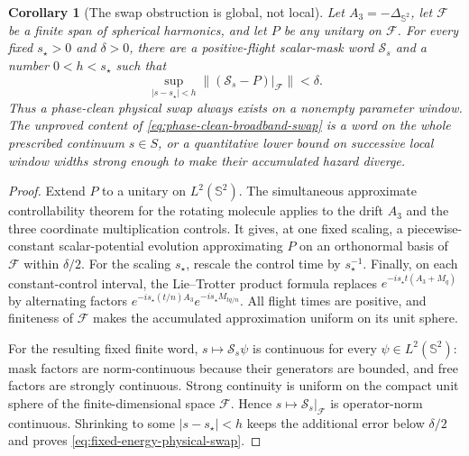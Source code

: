 \documentclass[11pt]{article}
\newtheorem{corollary}[theorem]{Corollary}
\theoremstyle{remark}
\begin{document}
\begin{corollary}[The swap obstruction is global, not local]
\label{cor:fixed-energy-swap}
Let $A_3=-\Delta_{\mathbb S^2}$, let $\mathcal F$ be a finite span of spherical
harmonics, and let $P$ be any unitary on $\mathcal F$.  For every fixed
$s_\star>0$ and $\delta>0$, there are a positive-flight scalar-mask word
$\mathcal S_s$ and a number $0<h<s_\star$ such that
\begin{equation}
 \sup_{|s-s_\star|<h}
 \|(\mathcal S_s-P)|_{\mathcal F}\|<\delta.
 \label{eq:fixed-energy-physical-swap}
\end{equation}
Thus a phase-clean physical swap always exists on a nonempty parameter
window.  The unproved content of
\eqref{eq:phase-clean-broadband-swap} is a word on the whole prescribed
continuum $s\in S$, or a quantitative lower bound on successive local window
widths strong enough to make their accumulated hazard diverge.
\end{corollary}

\begin{proof}
Extend $P$ to a unitary on $L^2(\mathbb S^2)$.  The simultaneous approximate
controllability theorem for the rotating molecule
\cite{BoscainCaponigroSigalotti2012} applies to the drift $A_3$ and the three
coordinate multiplication controls.  It gives, at one fixed scaling, a
piecewise-constant scalar-potential evolution approximating $P$ on an
orthonormal basis of $\mathcal F$ within $\delta/2$.  For the scaling
$s_\star$, rescale the control time by $s_\star^{-1}$.  Finally, on each
constant-control interval,
the Lie--Trotter product formula replaces
$e^{-is_\star t(A_3+M_q)}$ by alternating factors
$e^{-is_\star(t/n)A_3}e^{-is_\star M_{tq/n}}$.  All flight times are positive,
and finiteness of $\mathcal F$ makes the accumulated approximation uniform on
its unit sphere.

For the resulting fixed finite word, $s\mapsto\mathcal S_s\psi$ is continuous
for every $\psi\in L^2(\mathbb S^2)$: mask factors are norm-continuous because
their generators are bounded, and free factors are strongly continuous.
Strong continuity is uniform on the compact unit sphere of the
finite-dimensional space $\mathcal F$.  Hence
$s\mapsto\mathcal S_s|_{\mathcal F}$ is operator-norm continuous.  Shrinking
to some $|s-s_\star|<h$ keeps the additional error below $\delta/2$ and proves
\eqref{eq:fixed-energy-physical-swap}.
\end{proof}
\end{document}

